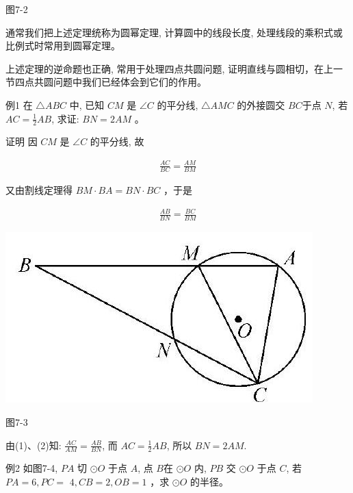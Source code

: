 \documentclass[10pt]{article}
\begin{document}
图7-2

通常我们把上述定理统称为圆幂定理, 计算圆中的线段长度, 处理线段的乘积式或比例式时常用到圆幂定理。

上述定理的逆命题也正确, 常用于处理四点共圆问题, 证明直线与圆相切，在上一节四点共圆问题中我们已经体会到它们的作用。

例1 在 $\triangle A B C$ 中, 已知 $C M$ 是 $\angle C$ 的平分线, $\triangle A M C$ 的外接圆交 $B C$于点 $N$, 若 $A C=\frac{1}{2} A B$, 求证: $B N=2 A M$ 。

证明 因 $C M$ 是 $\angle C$ 的平分线, 故

\begin{align*}
\frac{A C}{B C}=\frac{A M}{B M} \tag{1}
\end{align*}

又由割线定理得 $B M \cdot B A=B N \cdot B C$ ，于是

\begin{align*}
\frac{A B}{B N}=\frac{B C}{B M} \tag{2}
\end{align*}

\begin{center}
\includegraphics[max width=\textwidth]{2024_10_30_66b8e5e701da2093c133g-052(1)}
\end{center}

图7-3

由(1)、(2)知: $\frac{A C}{A M}=\frac{A B}{B N}$, 而 $A C=\frac{1}{2} A B$, 所以 $B N=2 A M$.

例2 如图7-4, $P A$ 切 $\odot O$ 于点 $A$, 点 $B$在 $\odot O$ 内, $P B$ 交 $\odot O$ 于点 $C$, 若 $P A=6, P C=$ $4, C B=2, O B=1$ ，求 $\odot O$ 的半径。
\end{document}
